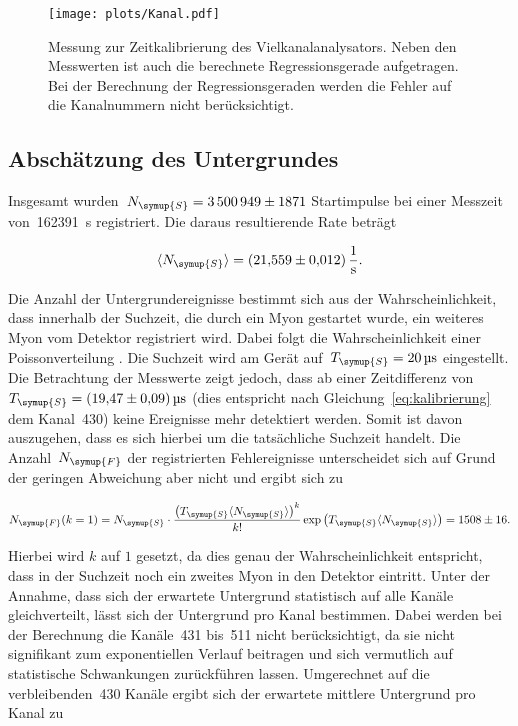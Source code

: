 \begin{figure}[htb]
  \centering
  \texttt{[image: plots/Kanal.pdf]}
  \caption{Messung zur Zeitkalibrierung des Vielkanalanalysators. Neben den
  Messwerten ist auch die berechnete Regressionsgerade aufgetragen. Bei der
  Berechnung der Regressionsgeraden werden die Fehler auf die Kanalnummern nicht
  berücksichtigt.}
  \label{fig:kalibrierung}
\end{figure}

\subsection{Abschätzung des Untergrundes}
Insgesamt wurden~$N_{\symup{S}}=\num{3500949(1871)}$ Startimpulse bei einer
Messzeit von~\SI{162391}{\second} registriert. Die daraus resultierende Rate
beträgt

\begin{equation}
  \langle N_{\symup{S}}\rangle=\SI{21.559(12)}{\per\second}.
  \label{eq:rate_start}
\end{equation}

Die Anzahl der Untergrundereignisse bestimmt sich aus der Wahrscheinlichkeit,
dass innerhalb der Suchzeit, die durch ein Myon gestartet wurde, ein weiteres
Myon vom Detektor registriert wird. Dabei folgt die Wahrscheinlichkeit einer
Poissonverteilung \cite{poisson}. Die Suchzeit wird am Gerät
auf~$T_{\symup{S}}=\SI{20}{\micro\second}$ eingestellt. Die Betrachtung der
Messwerte zeigt jedoch, dass ab einer Zeitdifferenz
von~$T_{\symup{S}}=\SI{19.47(9)}{\micro\second}$ (dies entspricht nach
Gleichung~\eqref{eq:kalibrierung} dem Kanal~\num{430}) keine Ereignisse mehr
detektiert werden. Somit ist davon auszugehen, dass es sich hierbei um die
tatsächliche Suchzeit handelt. Die Anzahl~$N_{\symup{F}}$ der registrierten
Fehlereignisse unterscheidet sich auf Grund der geringen Abweichung aber nicht und
ergibt sich zu

\begin{equation}
  N_{\symup{F}}(k=1)=N_{\symup{S}}\cdot\frac{\left(T_{\symup{S}}\langle N_{\symup{S}}\rangle\right)^k}{k!}\exp\left(T_{\symup{S}}\langle N_{\symup{S}}\rangle\right)=\num{1508(16)}.
  \label{eq:untergrund_gesamt}
\end{equation}

Hierbei wird $k$ auf $1$ gesetzt, da dies genau der Wahrscheinlichkeit entspricht, dass in der
Suchzeit noch ein zweites Myon in den Detektor eintritt. Unter der Annahme, dass sich der erwartete Untergrund statistisch auf alle
Kanäle gleichverteilt, lässt sich der Untergrund pro Kanal bestimmen. Dabei
werden bei der Berechnung die Kanäle~\num{431} bis~\num{511} nicht berücksichtigt,
da sie nicht signifikant zum exponentiellen Verlauf beitragen und sich vermutlich
auf statistische Schwankungen zurückführen lassen. Umgerechnet auf die verbleibenden~\num{430} Kanäle
ergibt sich der erwartete mittlere Untergrund pro Kanal zu

